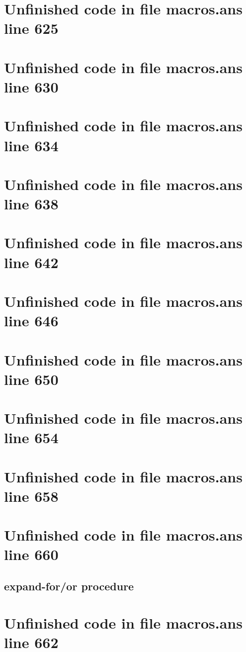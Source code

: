 \documentclass[twoside,9pt]{report}
\begin{document}
\section{Unfinished code in file macros.ans line 625}
\section{Unfinished code in file macros.ans line 630}
\section{Unfinished code in file macros.ans line 634}
\section{Unfinished code in file macros.ans line 638}
\section{Unfinished code in file macros.ans line 642}
\section{Unfinished code in file macros.ans line 646}
\section{Unfinished code in file macros.ans line 650}
\section{Unfinished code in file macros.ans line 654}
\section{Unfinished code in file macros.ans line 658}
\section{Unfinished code in file macros.ans line 660}
\subsection{expand-for/or procedure}
\label{expand-for/or-procedure}
\section{Unfinished code in file macros.ans line 662}
\end{document}

